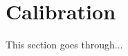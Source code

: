 \documentclass[../../main.tex]{subfiles}
\begin{document}
\section{Calibration} \label{appendix:calibration}

This section goes through...
\end{document}
